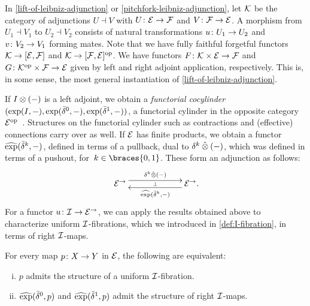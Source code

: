 \documentclass[reqno,10pt,a4paper,oneside,draft]{amsart}
\begin{document}
\begin{remark} \label{pitchfork-leibniz-most-general-example}
In \cref{lift-of-leibniz-adjunction} or \cref{pitchfork-leibniz-adjunction}, let $\cal{K}$ be the category of adjunctions $U \dashv V$ with $U \co \catE \to \cal{F}$ and $V \co \cal{F} \to \catE$.
A morphism from $U_1 \dashv V_1$ to $U_2 \dashv V_2$ consists of natural transformations $u \co U_1 \to U_2$ and $v \co V_2 \to V_1$ forming mates.
Note that we have fully faithful forgetful functors $\cal{K} \to [\catE, \cal{F}]$ and $\cal{K} \to [\cal{F}, \catE]^{\op}$.
We have functors $F \co \cal{K} \times \catE \to \cal{F}$ and $G \co \cal{K}^{\op} \times \cal{F} \to \catE$ given by left and right adjoint application, respectively.
This is, in some sense, the most general instantiation of \cref{lift-of-leibniz-adjunction}.
\end{remark}

\medskip

If $\interval \otimes (-)$ is a left adjoint, we obtain a \emph{functorial cocylinder} $(\exp(\interval, -), \exp(\bar{\delta}^0, -), \exp(\bar{\delta}^1, -))$, \ie a functorial cylinder in the opposite category $\catE^{\op}$~\cite{kamps-porter:homotopy}.
Structures on the functorial cylinder such as contractions and (effective) connections carry over as well.
If $\calE$ has finite products, we obtain a functor $\hatexp(\bar{\delta}^k, -)$, defined in terms of a pullback, dual to $\kcyl \hatotimes (-)$, which was defined in terms of a pushout, for~$k \in \braces{0, 1}$.
These form an adjunction as follows:
\[
\xymatrix@C+4em{
  \catE^\to \ar@<1ex>[r]^{\kcyl \hatotimes (-)} \ar@{}[r]|{\bot} &
  \catE^\to \rlap{.} \ar@<1ex>[l]^{\hatexp(\bar{\delta}^k, -)}
}
\]
For a functor $u \co \cal{I} \to \catE^\to$, we can apply the results obtained above to characterize uniform $\cal{I}$-fibrations, which we introduced in \cref{def:I-fibration}, in terms of right $\cal{I}$-maps.

\begin{proposition} \label{prod-exp-general}
For every map $p \co X \to Y$ in $\catE$, the following are equivalent:
\begin{enumerate}[(i)]
\item $p$ admits the structure of a uniform $\cal{I}$-fibration.
\item $\hatexp(\bar{\delta}^0, p)$ and $\hatexp(\bar{\delta}^1, p)$ admit the structure of right $\cal{I}$-maps.
\end{enumerate}
\end{proposition}
\end{document}
